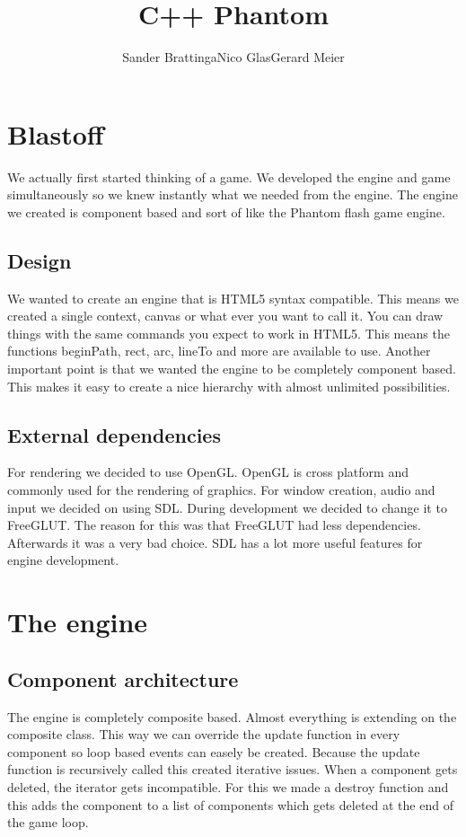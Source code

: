 \documentclass[acmtoplas,acmnow]{acmtrans2m}
\title{C++ Phantom}
\author{Sander Brattinga\newline Nico Glas\newline Gerard Meier}
\begin{document}
\begin{bottomstuff}
\end{bottomstuff}

\maketitle
\section{Blastoff}
We actually first started thinking of a game. We developed the engine and game simultaneously so we knew instantly what we needed from the engine. The engine we created is component based and sort of like the Phantom flash game engine. 

\subsection{Design}
We wanted to create an engine that is HTML5 syntax compatible. This means we created a single context, canvas or what ever you want to call it. You can draw things with the same commands you expect to work in HTML5. This means the functions beginPath, rect, arc, lineTo and more are available to use.\newline
Another important point is that we wanted the engine to be completely component based. This makes it easy to create a nice hierarchy with almost unlimited possibilities.

\subsection{External dependencies}
For rendering we decided to use OpenGL. OpenGL is cross platform and commonly used for the rendering of graphics. For window creation, audio and input we decided on using SDL. During development we decided to change it to FreeGLUT. The reason for this was that FreeGLUT had less dependencies. Afterwards it was a very bad choice. SDL has a lot more useful features for engine development.

\section{The engine}

\subsection{Component architecture}
The engine is completely composite based. Almost everything is extending on the composite class. This way we can override the update function in every component so loop based events can easely be created. Because the update function is recursively called this created iterative issues. When a component gets deleted, the iterator gets incompatible. For this we made a destroy function and this adds the component to a list of components which gets deleted at the end of the game loop. 
\end{document}
